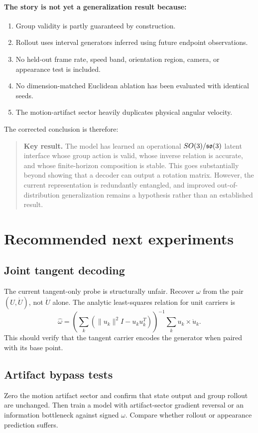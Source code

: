 \documentclass[11pt,a4paper]{article}
\newenvironment{keyresult}{\begin{quote}\color{reportgreen}\textbf{Key result.} }{\end{quote}}
\begin{document}
\paragraph{The story is not yet a generalization result because:}
\begin{enumerate}[leftmargin=*]
\item Group validity is partly guaranteed by construction.
\item Rollout uses interval generators inferred using future endpoint observations.
\item No held-out frame rate, speed band, orientation region, camera, or appearance test is included.
\item No dimension-matched Euclidean ablation has been evaluated with identical seeds.
\item The motion-artifact sector heavily duplicates physical angular velocity.
\end{enumerate}

The corrected conclusion is therefore:

\begin{keyresult}
The model has learned an operational $SO(3)/\mathfrak{so}(3)$ latent interface whose group action is valid, whose inverse relation is accurate, and whose finite-horizon composition is stable. This goes substantially beyond showing that a decoder can output a rotation matrix. However, the current representation is redundantly entangled, and improved out-of-distribution generalization remains a hypothesis rather than an established result.
\end{keyresult}

\section{Recommended next experiments}
\subsection{Joint tangent decoding}
The current tangent-only probe is structurally unfair. Recover $\omega$ from the pair $(U,\dot U)$, not $\dot U$ alone. The analytic least-squares relation for unit carriers is
\begin{equation}
\hat\omega=\left(\sum_k(\|u_k\|^2I-u_ku_k^T)\right)^{-1}\sum_k u_k\times\dot u_k.
\end{equation}
This should verify that the tangent carrier encodes the generator when paired with its base point.

\subsection{Artifact bypass tests}
Zero the motion artifact sector and confirm that state output and group rollout are unchanged. Then train a model with artifact-sector gradient reversal or an information bottleneck against signed $\omega$. Compare whether rollout or appearance prediction suffers.
\end{document}
